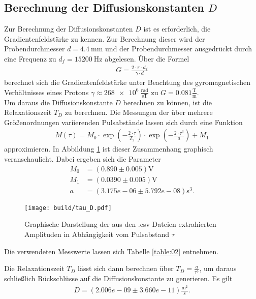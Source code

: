 \subsection{Berechnung der Diffusionskonstanten $D$}
\noindent Zur Berechnung der Diffusionskonstanten $D$ ist es erforderlich, die
Gradientenfeldstärke zu kennen. Zur Berechnung dieser wird der Probendurchmesser
$d = \SI{4.4}{\milli\meter}$ und der Probendurchmesser ausgedrückt durch eine
Frequenz zu $d_f = \SI{15200}{\hertz}$ abgelesen. Über die Formel
\begin{align}
  G = \frac{2 \cdot \pi \cdot d_f}{\gamma \cdot d}
  \label{eqn:05}
\end{align}
\noindent berechnet sich die Gradientenfeldstärke unter Beachtung des
gyromagnetischen Verhältnisses eines Protons $\gamma \approx \num{268e6} \:
\frac{\text{rad}}{\si{\second\tesla}}$ zu
$G = \num{0.081} \frac{\si{\tesla}}{\si{\meter}}$. \\
\noindent Um daraus die Diffusionskonstante $D$ berechnen zu können, ist die
Relaxationszeit $T_D$ zu berechnen. Die Messungen der über mehrere
Größenordnungen variierenden Pulsabstände lassen sich durch eine Funktion
\begin{align}
  M(\tau) = M_0 \cdot \exp{\left(- \frac{2 \cdot \tau}{T_2}\right)} \cdot \exp{\left(- \frac{2 \cdot \tau^3}{a}\right)} + M_1
 \label{eqn:06}
\end{align}
\noindent approximieren. In Abbildung \ref{fig:03} ist dieser Zusammenhang
graphisch veranschaulicht. Dabei ergeben sich die Parameter
\begin{align*}
  M_0 &=  (0.890  \pm  0.005)          \si{\volt} \\
  M_1 &=  (0.0390  \pm  0.005)         \si{\volt} \\
  a &=  (3.175e-06  \pm  5.792e-08) \si{\second^3}.
\end{align*}
\FloatBarrier
\begin{figure}
  \texttt{[image: build/tau\_D.pdf]}
  \caption{Graphische Darstellung der aus den .csv Dateien extrahierten
  Amplituden in Abhängigkeit vom Pulsabstand $\tau$}
  \label{fig:03}
\end{figure}
\FloatBarrier
\noindent Die verwendeten Messwerte lassen sich Tabelle \ref{table:02} entnehmen.
\FloatBarrier

\FloatBarrier
\noindent Die Relaxationszeit $T_D$ lässt sich dann berechnen über
$T_D = \frac{a}{\tau^3}$, um daraus schließlich Rückschlüsse auf die
Diffusionskonstante zu generieren. Es gilt
\begin{align*}
  D = (2.006e-09 \pm 3.660e-11) \frac{\si{\meter^2}}{\si{\second}}.
\end{align*}
